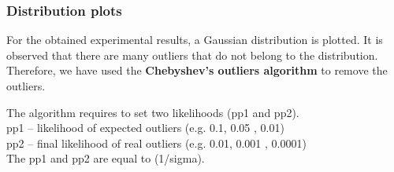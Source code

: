 \documentclass[11pt,a4paper]{article}
\begin{document}
				\subsubsection{Distribution plots} 
				For the obtained experimental results, a Gaussian distribution is plotted. It is observed that there are many outliers that do not belong to the distribution.\\
				Therefore, we have used the \textbf{Chebyshev's outliers algorithm} to remove the outliers.
				
				The algorithm requires to set two likelihoods (pp1 and pp2). \\
				pp1 -- likelihood of expected outliers (e.g. 0.1, 0.05 , 0.01)\\
				pp2 -- final likelihood of real outliers (e.g. 0.01, 0.001 , 0.0001)\\
				The pp1 and pp2 are equal to (1/sigma).\\
				
\end{document}
